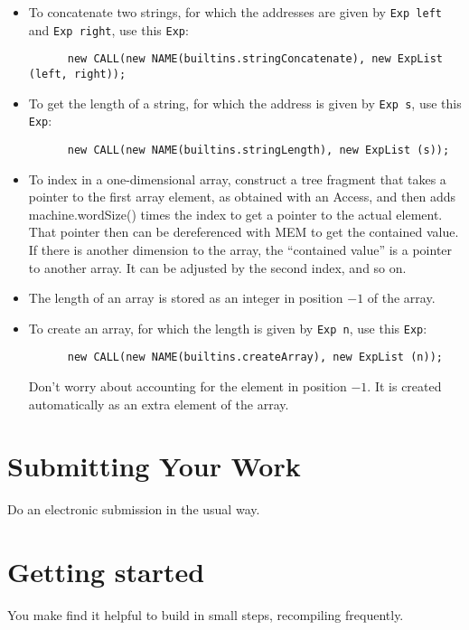 \documentclass[11pt]{article}
\begin{document}
\begin{itemize}
\item To concatenate two strings, for which the addresses are given by \verb'Exp left' and \verb'Exp right', use this \verb'Exp':
\begin{verbatim}
      new CALL(new NAME(builtins.stringConcatenate), new ExpList (left, right));
\end{verbatim}

\item To get the length of a string, for which the address is given by \verb'Exp s', use this \verb'Exp':
\begin{verbatim}
      new CALL(new NAME(builtins.stringLength), new ExpList (s));
\end{verbatim}

\item To index in a one-dimensional array, construct a tree fragment that takes a pointer to the first array element, as obtained with an Access, and then adds machine.wordSize() times the index to get a pointer to the actual element.  That pointer then can be dereferenced with MEM to get the contained value.  If there is another dimension to the array, the ``contained value'' is a pointer to another array.  It can be adjusted by the second index, and so on.

\item The length of an array is stored as an integer in position $-1$ of the array.

\item To create an array, for which the length is given by \verb'Exp n', use this \verb'Exp':
\begin{verbatim}
      new CALL(new NAME(builtins.createArray), new ExpList (n));
\end{verbatim}
Don't worry about accounting for the element in position $-1$.  It is created automatically as an extra element of the array.
\end{itemize}

\section{Submitting Your Work}
Do an electronic submission in the usual way.

\section{Getting started}
You make find it helpful to build in small steps, recompiling frequently.
\end{document}

